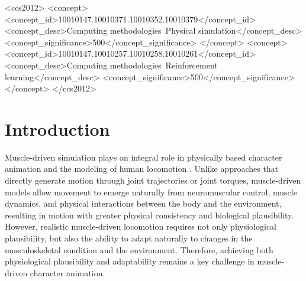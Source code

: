 \documentclass[acmtog,review,anonymous]{acmart}
\begin{document}
\begin{CCSXML}
<ccs2012>
 <concept>
  <concept_id>10010147.10010371.10010352.10010379</concept_id>
  <concept_desc>Computing methodologies~Physical simulation</concept_desc>
  <concept_significance>500</concept_significance>
 </concept>
 <concept>
  <concept_id>10010147.10010257.10010258.10010261</concept_id>
  <concept_desc>Computing methodologies~Reinforcement learning</concept_desc>
  <concept_significance>500</concept_significance>
 </concept>
</ccs2012>
\end{CCSXML}


\maketitle

\section{Introduction}
\label{sec:introduction}
Muscle-driven simulation plays an integral role in physically based character animation and the modeling of human locomotion \cite{sun2024,schumacher2025}. Unlike approaches that directly generate motion through joint trajectories or joint torques, muscle-driven models allow movement to emerge naturally from neuromuscular control, muscle dynamics, and physical interactions between the body and the environment, resulting in motion with greater physical consistency and biological plausibility. However, realistic muscle-driven locomotion requires not only physiological plausibility, but also the ability to adapt naturally to changes in the musculoskeletal condition and the environment. Therefore, achieving both physiological plausibility and adaptability remains a key challenge in muscle-driven character animation.
\end{document}
